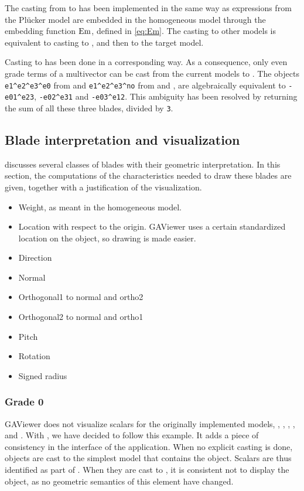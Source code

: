 The casting from \lga{} to \pga{} has been implemented in the same way as expressions from the Pl\"ucker model are embedded in the homogeneous model through the embedding function $\operatorname{Em}$, defined in \autoref{eq:Em}.  The casting to other models is equivalent to casting to \pga{}, and then to the target model.

Casting to \lga{} has been done in a corresponding way.  As a consequence, only even grade terms of a multivector can be cast from the current models to \lga{}.  The objects \texttt{e1\^{}e2\^{}e3\^{}e0} from \pga{} and \texttt{e1\^{}e2\^{}e3\^{}no} from \cga{} and \cbga{}, are algebraically equivalent to \texttt{-e01\^{}e23}, \texttt{-e02\^{}e31} and \texttt{-e03\^{}e12}.  This ambiguity has been resolved by returning the sum of all these three blades, divided by \texttt{3}.

\subsection{Blade interpretation and visualization}
 discusses several classes of blades with their geometric interpretation.  In this section, the computations of the characteristics needed to draw these blades are given, together with a justification of the visualization.

\begin{itemize}
  \item Weight, as meant in the homogeneous model.
  \item Location with respect to the origin.  GAViewer uses a certain standardized location on the object, so drawing is made easier.
  \item Direction
  \item Normal
  \item Orthogonal1 to normal and ortho2
  \item Orthogonal2 to normal and ortho1
  \item Pitch
  \item Rotation
  \item Signed radius
\end{itemize}


\subsubsection{Grade 0}
GAViewer does not visualize scalars for the originally implemented models, \ega{}, \pga{}, \cga{}, \cbga{}, and \iga.  With \lga{}, we have decided to follow this example.  It adds a piece of consistency in the interface of the application.  When no explicit casting is done, objects are cast to the simplest model that contains the object.  Scalars are thus identified as part of \ega{}.  When they are cast to \lga{}, it is consistent not to display the object, as no geometric semantics of this element have changed.


